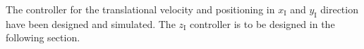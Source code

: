 \begin{minipage}{\linewidth}
\begin{minipage}{0.46\linewidth}
\begin{figure}[H]
            \centering
            \label{fig:positionControllersXYAction}
        \end{figure}
    \end{minipage}
\end{minipage}

The controller for the translational velocity and positioning in $x_{\mathrm{I}}$ and $y_{\mathrm{I}}$ direction have been designed and simulated. The $z_{\mathrm{I}}$ controller is to be designed in the following section.

